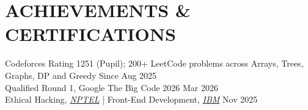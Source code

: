 \documentclass[a4paper,10pt]{article}
\begin{document}
\section*{ACHIEVEMENTS \& CERTIFICATIONS}
\noindent Codeforces Rating 1251 (Pupil); 200+ LeetCode problems across Arrays, Trees, Graphs, DP and Greedy \hfill Since Aug 2025 \\[2pt]
\noindent Qualified Round 1, Google The Big Code 2026 \hfill Mar 2026 \\[2pt]
\noindent Ethical Hacking, \href{https://archive.nptel.ac.in/content/noc/NOC25/SEM2/Ecertificates/106/noc25-cs142/Course/NPTEL25CS142S95870044610447804.pdf}{\textit{\color{mainblue}NPTEL}} \quad | \quad Front-End Development, \href{https://www.coursera.org/account/accomplishments/verify/D8XEU0AX5Y9U}{\textit{\color{mainblue}IBM}} \hfill Nov 2025
\end{document}
